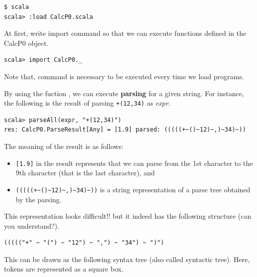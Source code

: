 \documentclass[11pt]{article}
\begin{document}
\begin{verbatim}
$ scala
scala> :load CalcP0.scala
\end{verbatim}

At first, write import command so that we can execute functions
defined in the CalcP0 object. 
\begin{verbatim}
scala> import CalcP0._
\end{verbatim}
Note that,  command is necessary to be executed
every time we load programs.

By using the fuction , we can execute \textbf{parsing} 
for a given string. For instance, the following is the result of
parsing \texttt{+(12,34)} as \emph{expr}.
\begin{verbatim}
scala> parseAll(expr, "+(12,34)")
res: CalcP0.ParseResult[Any] = [1.9] parsed: (((((+~()~12)~,)~34)~))
\end{verbatim}

The meaning of the result is as follows:
\begin{itemize}
\item \texttt{[1.9]} in the result represents that we can parse from the 1st
character to the 9th character (that is the last character), and
\item \texttt{(((((+\textasciitilde{}()\textasciitilde{}12)\textasciitilde{},)\textasciitilde{}34)\textasciitilde{}))} is a string representation of a parse
tree obtained by the parsing.
\end{itemize}

This representation looks difficult!! but it indeed has the following
structure (can you understand?). 
\begin{verbatim}
((((("+" ~ "(") ~ "12") ~ ",") ~ "34") ~ ")")
\end{verbatim}

This can be drawn as the following syntax tree (also called syntactic
tree). Here, tokens are represented as a square box. 
\end{document}
